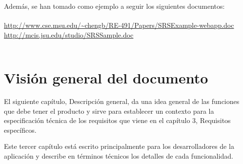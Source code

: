 Además, se han tomado como ejemplo a seguir los siguientes documentos:\\
\\
{\small
\url{http://www.cse.msu.edu/~chengb/RE-491/Papers/SRSExample-webapp.doc}\\
\url{http://mcis.jsu.edu/studio/SRSSample.doc}\\
}\\

\section{Visión general del documento}

El siguiente capítulo, Descripción general, da una idea general de las funciones
que debe tener el producto y sirve para establecer un contexto para la
especificación técnica de los requisitos que viene en el capítulo 3, Requisitos
específicos.

Este tercer capítulo está escrito principalmente para los desarrolladores de la
aplicación y describe en términos técnicos los detalles de cada funcionalidad.
